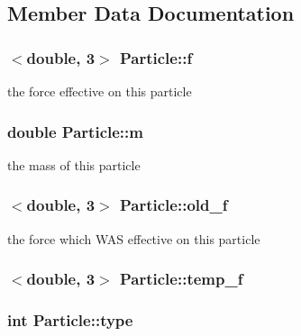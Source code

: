 \subsection{Member Data Documentation}
\hypertarget{classParticle_ad9aa3e171ea950b2cff1b4825e67845b}{
\subsubsection[{f}]{$<$double, 3$>$ Particle\-::f\hspace{0.3cm}{\ttfamily [private]}}}\label{classParticle_ad9aa3e171ea950b2cff1b4825e67845b}
the force effective on this particle \hypertarget{classParticle_aedcc7e1bc53b0e2b1a4a07c9a1b47563}{
\subsubsection[{m}]{\setlength{\rightskip}{0pt plus 5cm}double Particle\-::m\hspace{0.3cm}{\ttfamily [private]}}}\label{classParticle_aedcc7e1bc53b0e2b1a4a07c9a1b47563}
the mass of this particle \hypertarget{classParticle_ad9281e33474f23f7261f28848affc4a4}{
\subsubsection[{old\-\_\-f}]{$<$double, 3$>$ Particle\-::old\-\_\-f\hspace{0.3cm}{\ttfamily [private]}}}\label{classParticle_ad9281e33474f23f7261f28848affc4a4}
the force which W\-A\-S effective on this particle \hypertarget{classParticle_aef8faa875660fc5da7392d577af9d419}{
\subsubsection[{temp\-\_\-f}]{$<$double, 3$>$ Particle\-::temp\-\_\-f\hspace{0.3cm}{\ttfamily [private]}}}\label{classParticle_aef8faa875660fc5da7392d577af9d419}
\hypertarget{classParticle_a2b73dd42bcd56ba2e7ffeb0a5515a866}{
\subsubsection[{type}]{\setlength{\rightskip}{0pt plus 5cm}int Particle\-::type\hspace{0.3cm}{\ttfamily [private]}}}\label{classParticle_a2b73dd42bcd56ba2e7ffeb0a5515a866}
